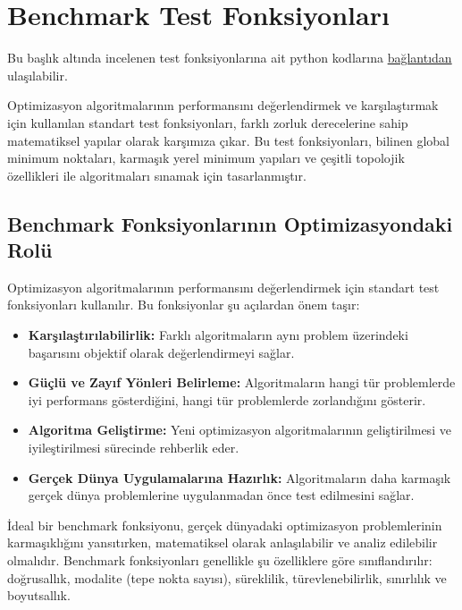 \section{Benchmark Test Fonksiyonları}
Bu başlık altında incelenen test fonksiyonlarına ait python kodlarına \href{https://github.com/btayfur/structural-optimization/blob/main/Code/Sources/OptimizationBenchmarks}{bağlantıdan} ulaşılabilir. 

Optimizasyon algoritmalarının performansını değerlendirmek ve karşılaştırmak için kullanılan standart test fonksiyonları, farklı zorluk derecelerine sahip matematiksel yapılar olarak karşımıza çıkar. Bu test fonksiyonları, bilinen global minimum noktaları, karmaşık yerel minimum yapıları ve çeşitli topolojik özellikleri ile algoritmaları sınamak için tasarlanmıştır.

\subsection{Benchmark Fonksiyonlarının Optimizasyondaki Rolü}

Optimizasyon algoritmalarının performansını değerlendirmek için standart test fonksiyonları kullanılır. Bu fonksiyonlar şu açılardan önem taşır:

\begin{itemize}
    \item \textbf{Karşılaştırılabilirlik:} Farklı algoritmaların aynı problem üzerindeki başarısını objektif olarak değerlendirmeyi sağlar.
    \item \textbf{Güçlü ve Zayıf Yönleri Belirleme:} Algoritmaların hangi tür problemlerde iyi performans gösterdiğini, hangi tür problemlerde zorlandığını gösterir.
    \item \textbf{Algoritma Geliştirme:} Yeni optimizasyon algoritmalarının geliştirilmesi ve iyileştirilmesi sürecinde rehberlik eder.
    \item \textbf{Gerçek Dünya Uygulamalarına Hazırlık:} Algoritmaların daha karmaşık gerçek dünya problemlerine uygulanmadan önce test edilmesini sağlar.
\end{itemize}

İdeal bir benchmark fonksiyonu, gerçek dünyadaki optimizasyon problemlerinin karmaşıklığını yansıtırken, matematiksel olarak anlaşılabilir ve analiz edilebilir olmalıdır. Benchmark fonksiyonları genellikle şu özelliklere göre sınıflandırılır: doğrusallık, modalite (tepe nokta sayısı), süreklilik, türevlenebilirlik, sınırlılık ve boyutsallık.

